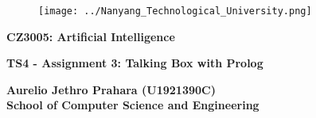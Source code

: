 \begin{titlepage}
   \begin{center}
   \begin{doublespacing}

       \begin{figure}
       \centering
       \texttt{[image: ../Nanyang\_Technological\_University.png]}
       \end{figure}
       
       
       \vspace*{5mm}
       {\large\textbf{CZ3005: Artificial Intelligence}}

       \vspace{30mm}
       
       {\Large\textbf{TS4 - Assignment 3: Talking Box with Prolog}}
            
       \vspace{30mm}

       {\Large\textbf{Aurelio Jethro Prahara (U1921390C)}}\\

       \vfill
        {\large \textbf{School of Computer Science and Engineering}}\\
       
    \end{doublespacing}

   \end{center}
\end{titlepage}
